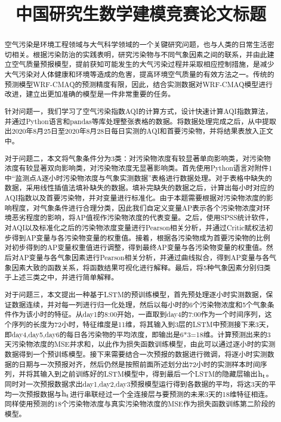 \documentclass[bwprint]{gmcmthesis}
\title{中国研究生数学建模竞赛论文标题}
\numberwithin{figure}{section}
\begin{document}
 \maketitle
 \begin{abstract}
空气污染是环境工程领域与大气科学领域的一个关键研究问题，也与人类的日常生活密切相关。根据污染防治的实践表明，研究污染物与不同气象因素之间的联系，并由此建立空气质量预报模型，提前获知可能发生的大气污染过程并采取相应控制措施，是减少大气污染对人体健康和环境等造成的危害，提高环境空气质量的有效方法之一。传统的预测模型WRF-CMAQ的预测精度有限，因此，结合实测数据对WRF-CMAQ模型进行改进，建立出更加准确的模型是一件非常重要的任务。

针对问题一，我们学习了空气污染指数AQI的计算方式，设计快速计算AQI指数算法，并通过Python语言和pandas等库处理整张表格的数据。将数据处理完成之后，从中提取出2020年8月25日至2020年8月28日每日实测的AQI和首要污染物，并将结果表放入正文中。

对于问题二，本文将气象条件分为3类：对污染物浓度有较显著单向影响类，对污染物浓度有较显著双向影响类，对污染物浓度无显著影响类。首先使用Python语言对附件1中“监测点A逐小时污染物浓度与气象实测数据”表格进行数据处理。对于表格中缺失的数据，采用线性插值法填补缺失的数据。填补完缺失的数据之后，计算出每小时对应的AQI指数以及首要污染物，并对变量进行标准化。由于本题需要根据对污染物浓度的影响程度，对气象条件进行合理分类，因此我们自定义变量AP表示各个污染物浓度对环境恶劣程度的影响，将AP值视作污染物浓度的代表变量。之后，使用SPSS统计软件，对AQI以及标准化之后的污染物浓度变量进行Pearson相关分析，并通过Critic赋权法初步得到AP变量与各污染物变量的权重值。接着，根据各污染物成为首要污染物的比例对初步得到的AP变量权重值进行调整，得到最终AP变量与各污染物变量的权重值。然后对AP变量与各气象因素进行Pearson相关分析，并通过曲线拟合，得到AP变量与各气象因素大致的函数关系，将函数结果可视化进行解释。最后，将5种气象因素分别归类于上述三类之中，并进行简单解释。

对于问题三，本文提出一种基于LSTM的预训练模型，首先预处理逐小时实测数据，保证数据连续，并对每一列进行归一化处理，然后以每小时的6个污染物浓度和5个气象条件作为该小时的特征。从day1的8:00开始，一直取到day4的7:00作为一个时间序列，这个序列的长度为72小时，特征维度是11维，将其输入到3层的LSTM中预测接下来3天，即day4,day5,day6的每日各污染物的平均浓度，即输出是6*3=18维。计算预测出来的3天污染物浓度的MSE并求和，以此作为损失函数训练模型，由此可以通过逐小时的实测数据得到一个预训练模型。接下来需要结合一次预报的数据进行微调，将逐小时实测数据的日期与一次预报对齐，然后仍然是按照前面所述划分出72小时的实测样本时间序列，并将其输入到之前训练好的LSTM模型中，得到最后一个LSTM的隐藏层输出$\rm h_t$。同时对一次预报数据求出day1,day2,day3预报模型运行得到各数据的平均，将这3天的平均一次预报数据与$\rm h_t$进行串联经过一个全连接层与要预测的未来3天的18维特征相连。同样使用预测的18个污染物浓度与真实污染物浓度的MSE作为损失函数训练第二阶段的模型。



\end{abstract}
\end{document}
